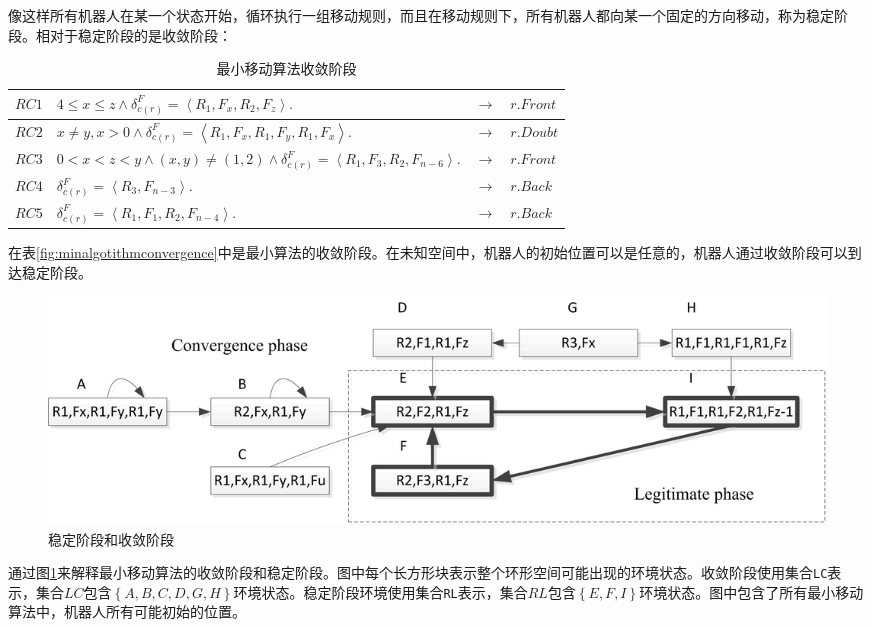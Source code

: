 像这样所有机器人在某一个状态开始，循环执行一组移动规则，而且在移动规则下，所有机器人都向某一个固定的方向移动，称为稳定阶段。相对于稳定阶段的是收敛阶段：

\begin{table}[hbt]
    \centering
    \caption{最小移动算法收敛阶段}
    \begin{tabular}{|p{2cm}|p{8cm}|p{1cm}|p{2cm}|}
        \hline
        $RC1$&$4 \leq x \leq z  \land \delta_{c\left(r\right)}^F = \left\langle R_1,F_x,R_2,F_z\right\rangle.$&$\rightarrow$&$r.Front$\\
        \hline
        $RC2$&$x \neq y,x>0 \land \delta_{c\left(r\right)}^F = \left\langle R_1,F_x,R_1,F_y,R_1,F_x\right\rangle.$&$\rightarrow$&$r.Doubt$\\
        \hline
        $RC3$&$0<x<z<y \land \left( x,y \right) \neq  \left( 1,2 \right)\land \delta_{c \left(r\right)}^F = \left\langle R_1,F_3,R_2,F_{n-6}\right\rangle.$&$\rightarrow$&$r.Front$\\
        \hline
        $RC4$&$\delta_{c\left(r\right)}^F = \left\langle R_3,F_{n-3}\right\rangle.$&$\rightarrow$&$r.Back$\\
        \hline
        $RC5$&$\delta_{c\left(r\right)}^F = \left\langle R_1,F_1,R_2,F_{n-4}\right\rangle.$&$\rightarrow$&$r.Back$\\
        \hline
    \end{tabular}
    \label{table:minalgotithmconvergence}
\end{table}

在表\ref{fig:minalgotithmconvergence}中是最小算法的收敛阶段。在未知空间中，机器人的初始位置可以是任意的，机器人通过收敛阶段可以到达稳定阶段。

\begin{figure}[!hbt]
	\centering
	\includegraphics[width=6 in]{fig/cp_lp.png}
	\caption{稳定阶段和收敛阶段}
	\label{fig:cp_lp}
\end{figure}

通过图\ref{fig:cp_lp}来解释最小移动算法的收敛阶段和稳定阶段。图中每个长方形块表示整个环形空间可能出现的环境状态。收敛阶段使用集合\verb|LC|表示，集合$LC$包含$\left\{A,B,C,D,G,H\right\}$环境状态。稳定阶段环境使用集合\verb|RL|表示，集合$RL$包含$\left\{E,F,I\right\}$环境状态。图中包含了所有最小移动算法中，机器人所有可能初始的位置。

